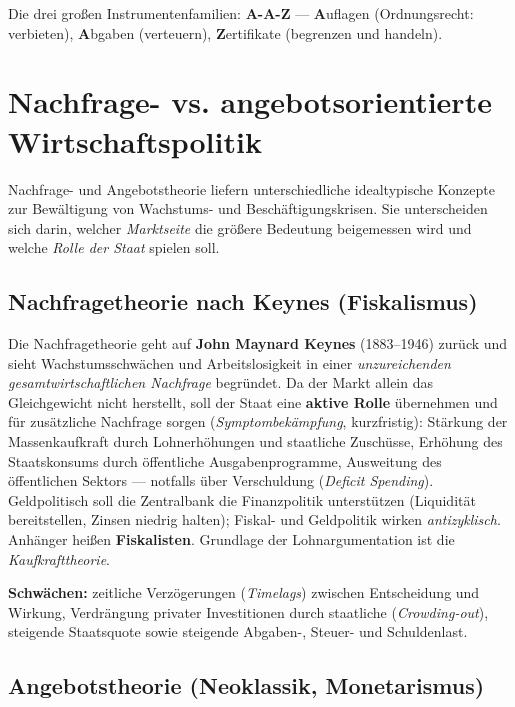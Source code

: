 \documentclass[11pt, a4paper]{article}
\begin{document}
\begin{eselsbruecke}
Die drei großen Instrumentenfamilien: \textbf{A-A-Z} --- \textbf{A}uflagen (Ordnungsrecht:
verbieten), \textbf{A}bgaben (verteuern), \textbf{Z}ertifikate (begrenzen und handeln).
\end{eselsbruecke}

\section{Nachfrage- vs. angebotsorientierte Wirtschaftspolitik}

Nachfrage- und Angebotstheorie liefern unterschiedliche idealtypische Konzepte zur
Bewältigung von Wachstums- und Beschäftigungskrisen. Sie unterscheiden sich darin, welcher
\emph{Marktseite} die größere Bedeutung beigemessen wird und welche \emph{Rolle der Staat}
spielen soll.

\subsection{Nachfragetheorie nach Keynes (Fiskalismus)}

Die Nachfragetheorie geht auf \textbf{John Maynard Keynes} (1883--1946) zurück und sieht
Wachstumsschwächen und Arbeitslosigkeit in einer \emph{unzureichenden gesamtwirtschaftlichen
Nachfrage} begründet. Da der Markt allein das Gleichgewicht nicht herstellt, soll der Staat
eine \textbf{aktive Rolle} übernehmen und für zusätzliche Nachfrage sorgen
(\emph{Symptombekämpfung}, kurzfristig): Stärkung der Massenkaufkraft durch Lohnerhöhungen
und staatliche Zuschüsse, Erhöhung des Staatskonsums durch öffentliche Ausgabenprogramme,
Ausweitung des öffentlichen Sektors --- notfalls über Verschuldung (\emph{Deficit
Spending}). Geldpolitisch soll die Zentralbank die Finanzpolitik unterstützen (Liquidität
bereitstellen, Zinsen niedrig halten); Fiskal- und Geldpolitik wirken \emph{antizyklisch}.
Anhänger heißen \textbf{Fiskalisten}. Grundlage der Lohnargumentation ist die
\emph{Kaufkrafttheorie}.

\textbf{Schwächen:} zeitliche Verzögerungen (\emph{Timelags}) zwischen Entscheidung und
Wirkung, Verdrängung privater Investitionen durch staatliche (\emph{Crowding-out}),
steigende Staatsquote sowie steigende Abgaben-, Steuer- und Schuldenlast.

\subsection{Angebotstheorie (Neoklassik, Monetarismus)}
\end{document}
